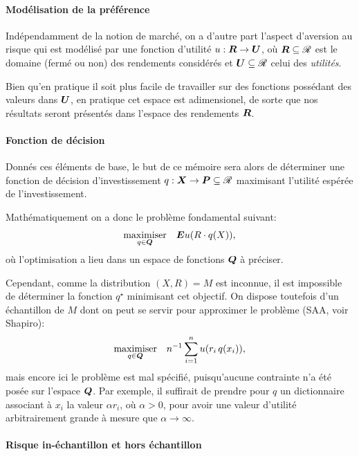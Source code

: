 \paragraph{Modélisation de la préférence}

Indépendamment de la notion de marché, on a d'autre part l'aspect d'aversion au risque qui
est modélisé par une fonction d'utilité $u:\R\to\U$, où $\R \subseteq \Re$ est le domaine (fermé ou
non) des rendements considérés et $\U \subseteq \Re$ celui des \textit{utilités}.

Bien qu'en pratique il soit plus facile de travailler sur des fonctions possédant des
valeurs dans $\U$, en pratique cet espace est adimensionel\cit, de sorte que nos résultats
seront présentés dans l'espace des rendements $\R$.


\paragraph{Fonction de décision}

Donnés ces éléments de base, le but de ce mémoire sera alors de déterminer une fonction de
décision d'investissement $q: \X \to \P \subseteq \Re$ maximisant l'utilité espérée de l'investissement.

Mathématiquement on a donc le problème fondamental suivant:
\begin{equation}
  \maximizeEquation[q \in \Q]{\E u(R \cdot q(X)),}
\end{equation}
où l'optimisation a lieu dans un espace de fonctions $\Q$ à préciser.

Cependant, comme la distribution $(X,R) = M$ est inconnue, il est impossible de déterminer
la fonction $q^\star$ minimisant cet objectif. On dispose toutefois d'un échantillon de
$M$ dont on peut se servir pour approximer le problème (SAA, voir Shapiro\cit):
\begin{equation}
  \maximizeEquation[q \in \Q]{n^{-1} \sumi u(r_i\, q(x_i)),}
\end{equation}
mais encore ici le problème est mal spécifié, puisqu'aucune contrainte n'a été posée sur
l'espace $\Q$. Par exemple, il suffirait de prendre pour $q$ un dictionnaire associant à
$x_i$ la valeur $\alpha r_i$, où $\alpha > 0$, pour avoir une valeur d'utilité arbitrairement grande
à mesure que $\alpha \to \infty$.


\paragraph{Risque in-échantillon et hors échantillon}

